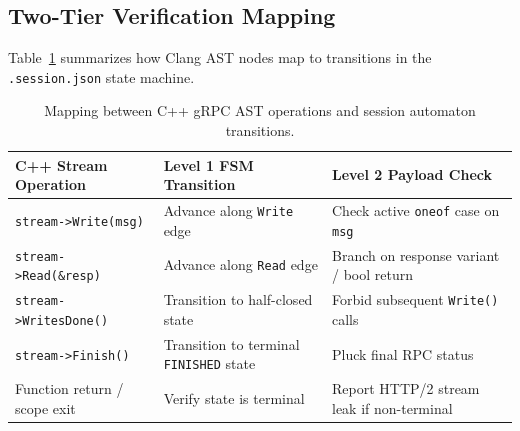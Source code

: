\documentclass[11pt,a4paper]{article}
\begin{document}
\subsection{Two-Tier Verification Mapping}

Table~\ref{tab:ast-mapping} summarizes how Clang AST nodes map to transitions in the \texttt{.session.json} state machine.

\begin{table}[htbp]
\centering
\small
\begin{tabular}{@{}lll@{}}
\toprule
\textbf{C++ Stream Operation} & \textbf{Level 1 FSM Transition} & \textbf{Level 2 Payload Check} \\
\midrule
\texttt{stream->Write(msg)} & Advance along \texttt{Write} edge & Check active \texttt{oneof} case on \texttt{msg} \\
\texttt{stream->Read(\&resp)} & Advance along \texttt{Read} edge & Branch on response variant / bool return \\
\texttt{stream->WritesDone()} & Transition to half-closed state & Forbid subsequent \texttt{Write()} calls \\
\texttt{stream->Finish()} & Transition to terminal \texttt{FINISHED} state & Pluck final RPC status \\
Function return / scope exit & Verify state is terminal & Report HTTP/2 stream leak if non-terminal \\
\bottomrule
\end{tabular}
\caption{Mapping between C++ gRPC AST operations and session automaton transitions.}
\label{tab:ast-mapping}
\end{table}
\end{document}
